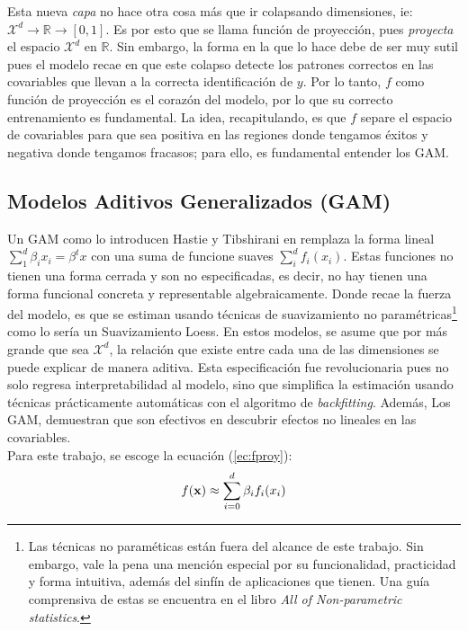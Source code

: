 \documentclass[../Main/Main.tex]{subfiles}
\begin{document}
Esta nueva \textit{capa} no hace otra cosa más que ir colapsando dimensiones, ie: $\mathcal{X}^d \rightarrow \mathbb{R} \rightarrow [0,1]$. Es por esto que se llama función de proyección, pues \textit{proyecta} el espacio $\mathcal{X}^d$ en  $\mathbb{R}$. Sin embargo, la forma en la que lo hace debe de ser muy sutil pues el modelo recae en que este colapso detecte los patrones correctos en las covariables que llevan a la correcta identificación de $y$. Por lo tanto, $f$ como función de proyección es el corazón del modelo, por lo que su correcto entrenamiento es fundamental. La idea, recapitulando, es que $f$ separe el espacio de covariables para que sea positiva en las regiones donde tengamos éxitos y negativa donde tengamos fracasos; para ello, es fundamental entender los GAM.\\

\subsection{Modelos Aditivos Generalizados (GAM)} \label{sec:GAM}
Un GAM como lo introducen Hastie y Tibshirani en \autocite{hastie1986generalized} remplaza la forma lineal $\sum_{1}^d\beta_ix_i = \beta^tx$ con una suma de funcione suaves $\sum_i^d f_i(x_i)$. Estas funciones no tienen una forma cerrada y son no especificadas, es decir, no hay tienen una forma funcional concreta y representable algebraicamente. Donde recae la fuerza del modelo, es que se estiman usando técnicas de suavizamiento no paramétricas\footnote{Las técnicas no paraméticas están fuera del alcance de este trabajo. Sin embargo, vale la pena una mención especial por su funcionalidad, practicidad y forma intuitiva, además del sinfín de aplicaciones que tienen. Una guía comprensiva de estas se encuentra en el libro \textit{All of Non-parametric statistics}\autocite{wasserman2007all}.} como lo sería un Suavizamiento Loess. En estos modelos, se asume que por más grande que sea $\mathcal{X}^d$, la relación que existe entre cada una de las dimensiones se puede explicar de manera aditiva. Esta especificación fue revolucionaria pues no solo regresa interpretabilidad al modelo, sino que simplifica la estimación usando técnicas prácticamente automáticas con el algoritmo de \textit{backfitting}. Además, Los GAM, demuestran que son efectivos en descubrir efectos no lineales en las covariables. \\

Para este trabajo, se escoge la ecuación (\ref{ec:fproy}): 
\begin{align*}
	f(\mathbf{x}) \approx \sum_{i=0}^d \beta_i f_i(x_i) 
\end{align*}
\end{document}
